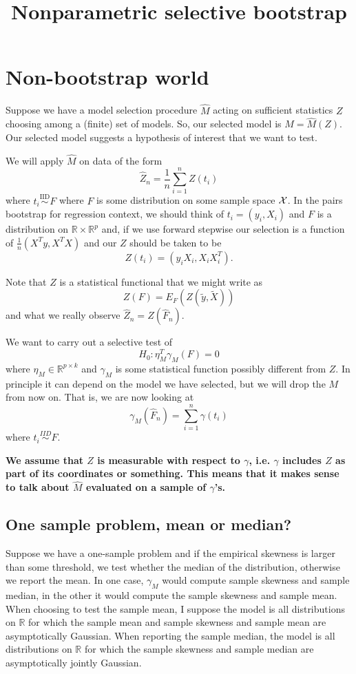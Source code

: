 \documentclass{article}
\newcommand{\real}{\mathbb{R}}
\begin{document}
\title{Nonparametric selective bootstrap}

\maketitle

\section{Non-bootstrap world}

Suppose we have a model selection procedure $\hat{M}$ acting on sufficient
statistics $Z$ choosing among a (finite) set of models. So, our selected model
is $M=\hat{M}(Z)$. Our selected model suggests a hypothesis of interest that we want to test.

We will apply $\hat{M}$ on data of the form
$$
\hat{Z}_n = \frac{1}{n} \sum_{i=1}^n Z(t_i) 
$$
where $t_i \overset{\text{IID}}{\sim} F$ where $F$
is some distribution on some sample space ${\cal X}$. In the pairs bootstrap for 
regression context, we should think of $t_i=(y_i, X_i)$ and $F$ 
is a distribution on $\real \times \real^p$ and, if we use
forward stepwise our
selection is a function of $\frac{1}{n}(X^Ty, X^TX)$
and our $Z$ should be taken to be
$$
Z(t_i) = (y_iX_i, X_iX_i^T).
$$

Note that $Z$ is a statistical functional that we might write as
$$
Z(F) = E_{F}(Z(\tilde{y}, \tilde{X}))
$$
and what we really observe $\hat{Z}_n = Z(\hat{F}_n)$. 

We want to carry out a selective test of
$$
H_0: \eta_{M}^T \gamma_M(F) = 0
$$
where $\eta_M \in \real^{p \times k}$ and $\gamma_M$ is some statistical
function possibly different from $Z$. In principle it can depend
on the model we have selected, but we will drop the $M$ from now on.
That is, we are now looking at
$$
\gamma_M(\hat{F}_n) = \sum_{i=1}^n \gamma(t_i)
$$
where $t_i \overset{IID}{\sim} F$.

{\bf We assume that $Z$ is measurable with respect to $\gamma$, i.e.
$\gamma$ includes $Z$ as part of its coordinates or something. This means
that it makes sense to talk about $\hat{M}$ evaluated
on a sample of $\gamma$'s.}

\subsection{One sample problem, mean or median?}

Suppose we have a one-sample problem and if the empirical skewness
is larger than some threshold, we test whether the median of the 
distribution, otherwise we report the mean. In one case,
$\gamma_M$ would compute sample skewness and sample median, in the other
it would compute the sample skewness and sample mean. When choosing to test the sample mean, I suppose the model is all distributions on $\real$ for
which the sample mean and sample skewness and sample mean 
are asymptotically Gaussian. When
reporting the sample median, the model is all distributions on $\real$
for which the sample skewness and sample median are asymptotically jointly Gaussian.
\end{document}
